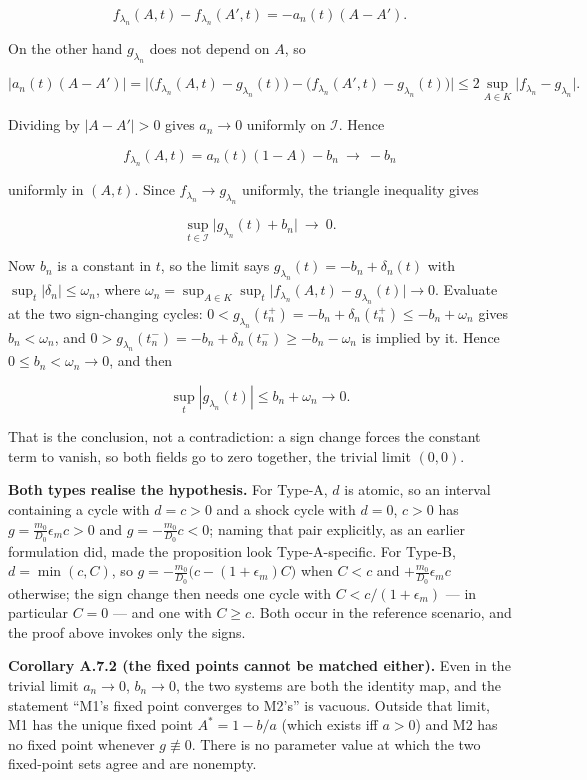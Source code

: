 \documentclass[11pt,a4paper]{article}
\newcounter{none}
\begin{document}
\[
f_{\lambda_n}(A,t)-f_{\lambda_n}(A',t)=-a_n(t)(A-A').
\]

On the other hand \(g_{\lambda_n}\) does not depend on \(A\), so

\[
\big|a_n(t)(A-A')\big|
=\big|\big(f_{\lambda_n}(A,t)-g_{\lambda_n}(t)\big)
-\big(f_{\lambda_n}(A',t)-g_{\lambda_n}(t)\big)\big|
\le 2\sup_{A\in K}\big|f_{\lambda_n}-g_{\lambda_n}\big|.
\]

Dividing by \(|A-A'|>0\) gives \(a_n\to0\) uniformly on \(\mathcal{I}\). Hence

\[
f_{\lambda_n}(A,t)=a_n(t)(1-A)-b_n\ \longrightarrow\ -b_n
\]

uniformly in \((A,t)\). Since \(f_{\lambda_n}\to g_{\lambda_n}\) uniformly, the
triangle inequality gives

\[
\sup_{t\in\mathcal{I}}\big|g_{\lambda_n}(t)+b_n\big|\ \longrightarrow\ 0 .
\]

Now \(b_n\) is a constant in \(t\), so the limit says
\(g_{\lambda_n}(t)=-b_n+\delta_n(t)\) with \(\sup_t|\delta_n|\le\omega_n\), where
\(\omega_n=\sup_{A\in K}\sup_{t}\big|f_{\lambda_n}(A,t)-g_{\lambda_n}(t)\big|\to0\).
Evaluate at the two sign-changing cycles:
\(0<g_{\lambda_n}(t_n^+)=-b_n+\delta_n(t_n^+)\le-b_n+\omega_n\) gives
\(b_n<\omega_n\), and \(0>g_{\lambda_n}(t_n^-)=-b_n+\delta_n(t_n^-)\ge-b_n-\omega_n\)
is implied by it. Hence \(0\le b_n<\omega_n\to0\), and then

\[
\sup_t|g_{\lambda_n}(t)|\le b_n+\omega_n\longrightarrow0 .
\]

That is the conclusion, not a contradiction: a sign change forces the constant
term to vanish, so both fields go to zero together, the trivial limit \((0,0)\).

\textbf{Both types realise the hypothesis.} For Type-A, \(d\) is atomic, so an interval
containing a cycle with \(d=c>0\) and a shock cycle with \(d=0\), \(c>0\) has
\(g=\frac{m_0}{D_0}\epsilon_mc>0\) and \(g=-\frac{m_0}{D_0}c<0\); naming that pair
explicitly, as an earlier formulation did, made the proposition look
Type-A-specific. For Type-B, \(d=\min(c,C)\), so
\(g=-\frac{m_0}{D_0}\big(c-(1+\epsilon_m)C\big)\) when \(C<c\) and
\(+\frac{m_0}{D_0}\epsilon_m c\) otherwise; the sign change then needs one cycle
with \(C<c/(1+\epsilon_m)\) --- in particular \(C=0\) --- and one with \(C\ge c\). Both
occur in the reference scenario, and the proof above invokes only the signs.

\textbf{Corollary A.7.2 (the fixed points cannot be matched either).} Even in the
trivial limit \(a_n\to0\), \(b_n\to0\), the two systems are both the identity map,
and the statement ``M1's fixed point converges to M2's'' is vacuous. Outside that
limit, M1 has the unique fixed point \(A^\ast=1-b/a\) (which exists iff \(a>0\)) and
M2 has no fixed point whenever \(g\not\equiv0\). There is no parameter value at
which the two fixed-point sets agree and are nonempty.
\end{document}
